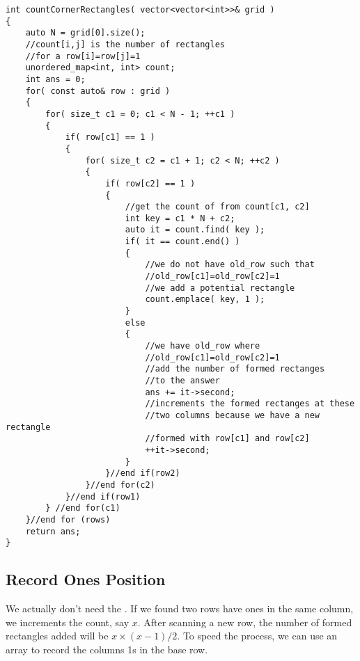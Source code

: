 \setcounter{lstlisting}{0}
\begin{lstlisting}[style=customc, caption={Count Corners}]
int countCornerRectangles( vector<vector<int>>& grid )
{
    auto N = grid[0].size();
    //count[i,j] is the number of rectangles
    //for a row[i]=row[j]=1
    unordered_map<int, int> count;
    int ans = 0;
    for( const auto& row : grid )
    {
        for( size_t c1 = 0; c1 < N - 1; ++c1 )
        {
            if( row[c1] == 1 )
            {
                for( size_t c2 = c1 + 1; c2 < N; ++c2 )
                {
                    if( row[c2] == 1 )
                    {
                        //get the count of from count[c1, c2]
                        int key = c1 * N + c2;
                        auto it = count.find( key );
                        if( it == count.end() )
                        {
                            //we do not have old_row such that
                            //old_row[c1]=old_row[c2]=1
                            //we add a potential rectangle
                            count.emplace( key, 1 );
                        }
                        else
                        {
                            //we have old_row where
                            //old_row[c1]=old_row[c2]=1
                            //add the number of formed rectanges
                            //to the answer
                            ans += it->second;
                            //increments the formed rectanges at these
                            //two columns because we have a new rectangle
                            //formed with row[c1] and row[c2]
                            ++it->second;
                        }
                    }//end if(row2)
                }//end for(c2)
            }//end if(row1)
        } //end for(c1)
    }//end for (rows)
    return ans;
}
\end{lstlisting}

\subsection{Record Ones Position}
We actually don't need the . If we found two rows have ones in the same column, we increments the count, say $x$. After scanning a new row, the number of formed rectangles added will be $x\times (x-1)/2$. To speed the process, we can use an array to record the columns 1s in the base row.

